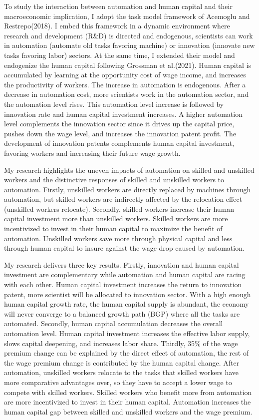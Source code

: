 \documentclass[12pt]{article}
\begin{document}
To study the interaction between automation and human capital and their macroeconomic implication, I adopt the task model framework of Acemoglu and Restrepo(2018)\cite{AcemogluRestrepo2018}. I embed this framework in a dynamic environment where research and development (R\&D) is directed and endogenous, scientists can work in automation (automate old tasks favoring machine) or innovation (innovate new tasks favoring labor) sectors. At the same time, I extended their model and endogenize the human capital following Grossman et al.(2021)\cite{Grossmanetal2021}. Human capital is accumulated by learning at the opportunity cost of wage income, and increases the productivity of workers. The increase in automation is endogenous. After a decrease in automation cost, more scientists work in the automation sector, and the automation level rises. This automation level increase is followed by innovation rate and human capital investment increases. A higher automation level complements the innovation sector since it drives up the capital price, pushes down the wage level, and increases the innovation patent profit. The development of innovation patents complements human capital investment, favoring workers and increasing their future wage growth. 

My research highlights the uneven impacts of automation on skilled and unskilled workers and the distinctive responses of skilled and unskilled workers to automation. Firstly, unskilled workers are directly replaced by machines through automation, but skilled workers are indirectly affected by the relocation effect (unskilled workers relocate). Secondly, skilled workers increase their human capital investment more than unskilled workers. Skilled workers are more incentivized to invest in their human capital to maximize the benefit of automation. Unskilled workers save more through physical capital and less through human capital to insure against the wage drop caused by automation. 

My research delivers three key results. Firstly, innovation and human capital investment are complementary while automation and human capital are racing with each other. Human capital investment increases the return to innovation patent, more scientist will be allocated to innovation sector. With a high enough human capital growth rate, the human capital supply is abundant, the economy will never converge to a balanced growth path (BGP) where all the tasks are automated. Secondly, human capital accumulation decreases the overall automation level. Human capital investment increases the effective labor supply, slows capital deepening, and increases labor share. Thirdly, 35\% of the wage premium change can be explained by the direct effect of automation, the rest of the wage premium change is contributed by the human capital change. After automation, unskilled workers relocate to the tasks that skilled workers have more comparative advantages over, so they have to accept a lower wage to compete with skilled workers. Skilled workers who benefit more from automation are more incentivized to invest in their human capital. Automation increases the human capital gap between skilled and unskilled workers and the wage premium. 
\end{document}
